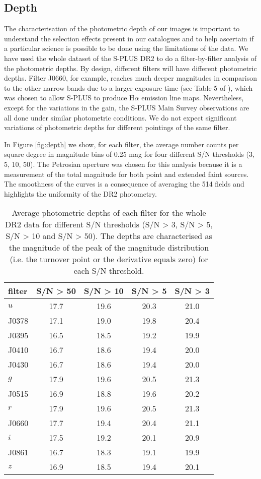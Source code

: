 \documentclass[fleqn,usenatbib]{mnras}
\begin{document}
\subsection{Depth}

The characterisation of the photometric depth of our images is important to understand the selection effects present in our catalogues and to help ascertain if a particular science is possible to be done using the limitations of the data. We have used the whole dataset of the S-PLUS DR2 to do a filter-by-filter analysis of the photometric depths. By design, different filters will have different photometric depths. Filter J0660, for example, reaches much deeper magnitudes in comparison to the other narrow bands due to a larger exposure time (see Table 5 of \citealp{MendesDeOliveira+2019}), which was chosen to allow S-PLUS to produce H$\alpha$ emission line maps.  Nevertheless, except for the variations in the gain, the S-PLUS Main Survey observations are all done under similar photometric conditions. We do not expect significant variations of photometric depths for different pointings of the same filter.

In Figure \ref{fig:depth} we show, for each filter, the average number counts per square degree in magnitude bins of 0.25 mag for four different S/N thresholds (3, 5, 10, 50). The Petrosian aperture was chosen for this analysis because it is a measurement of the total magnitude for both point and extended faint sources. The smoothness of the curves is a consequence of averaging the 514 fields and highlights the uniformity of the DR2 photometry.

\begin{table}
\caption{\label{tab:depth} Average photometric depths of each filter for the whole DR2 data for different S/N thresholds (S/N > 3, S/N > 5, S/N > 10 and S/N > 50). The depths are characterised as the magnitude of the peak of the magnitude distribution (i.e. the turnover point or the derivative equals zero) for each S/N threshold.}
\centering
\begin{tabular}{lcccc}
\hline \hline
filter & S/N > 50 & S/N > 10 & S/N > 5 & S/N > 3 \\ \hline
$u$ & 17.7 & 19.6 & 20.3 & 21.0 \\
J0378 & 17.1 & 19.0 & 19.8 & 20.4 \\
J0395 & 16.5 & 18.5 & 19.2 & 19.9 \\
J0410 & 16.7 & 18.6 & 19.4 & 20.0 \\
J0430 & 16.7 & 18.6 & 19.4 & 20.0 \\
$g$ & 17.9 & 19.6 & 20.5 & 21.3 \\
J0515 & 16.9 & 18.8 & 19.6 & 20.2 \\
$r$ & 17.9 & 19.6 & 20.5 & 21.3 \\
J0660 & 17.7 & 19.4 & 20.4 & 21.1 \\
$i$ & 17.5 & 19.2 & 20.1 & 20.9 \\
J0861 & 16.7 & 18.3 & 19.1 & 19.9 \\
$z$ & 16.9 & 18.5 & 19.4 & 20.1 \\
\hline \hline
\end{tabular}
\end{table}
\end{document}
